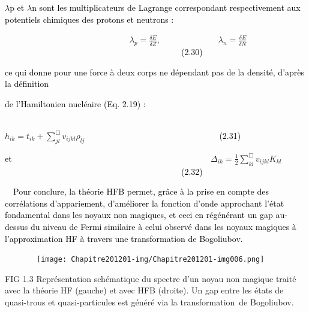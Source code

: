 \documentclass[a4paper]{article}
\begin{document}
\bigskip

\textcolor{black}{$\lambda $p et $\lambda $n sont les multiplicateurs de Lagrange correspondant respectivement aux
potentiels chimiques des protons et neutrons :}

\textcolor{black}{\ \ \ \ \ \ \ \ \ \ \ \ \ \ \ \ \ \ \ \ \ \ \ \ \ \ \ \ \ } $\lambda _p=\frac{\mathit{\delta
E}}{\mathit{\delta Z}},$\textcolor{black}{\ \ \ \ \ \ \ \ \ \ \ \ \ } $\lambda _n=\frac{\mathit{\delta
E}}{\mathit{\delta
N}}$\textcolor{black}{\ \ \ \ \ \ \ \ \ \ \ \ \ \ \ \ \ \ \ \ \ \ \ \ \ \ \ \ \ \ \ \ \ \ \ \ \ \ \ \ \ \ (2.30)}

\textcolor{black}{ce qui donne pour une force à deux corps ne dépendant pas de la densité, d’après la définition}

\textcolor{black}{de l’Hamiltonien nucléaire (Eq. 2.19) :}

\textcolor{black}{\ \ \ \ \ \ \ \ \ \ \ \ \ \ \ \ \ \ \ \ \ \ \ \ \ \ \ \ \ \ \ \ \ \ \ \ \ \ \ \ \ \ \ \ \ \ \ \ \ \ \ \ \ \ \ \ \ \ \ }
$h_{\mathit{ik}}=t_{\mathit{ik}}+\sum _{\mathit{jl}}^{\Box }v_{\mathit{ijkl}}\rho
_{\mathit{lj}}$\textcolor{black}{\ \ \ \ \ \ \ \ \ \ \ \ \ \ \ \ \ \ \ \ \ \ \ \ \ \ \ \ \ \ \ \ (2.31)}

\textcolor{black}{et}\textcolor{black}{
\ \ \ \ \ \ \ \ \ \ \ \ \ \ \ \ \ \ \ \ \ \ \ \ \ \ \ \ \ \ \ \ \ \ \ \ \ \ \ \ \ \ \ \ \ \ }
${\Delta}_{\mathit{ik}}=\frac 1 2\sum _{\mathit{kl}}^{\Box
}v_{\mathit{ijkl}}K_{\mathit{kl}}$\textcolor{black}{\ \ \ \ \ \ \ \ \ \ \ \ \ \ \ \ \ \ \ \ \ \ \ \ \ \ \ \ \ \ \ \ \ \ \ \ \ \ \ \ \ \ (2.32)}


\bigskip

\textcolor{black}{\ \ Pour conclure, la théorie HFB permet, grâce à la prise en compte des corrélations d’appariement,
d’améliorer la fonction d’onde approchant l’état fondamental dans les noyaux non magiques, et ceci en régénérant un gap
au-dessus du niveau de Fermi similaire à celui observé dans les noyaux magiques à l’approximation HF à travers une
transformation de Bogoliubov.}


\bigskip


\bigskip


\bigskip


\bigskip


\bigskip

\textbf{\textcolor{black}{\ \ \ \ \ \ }}
\texttt{[image: Chapitre201201-img/Chapitre201201-img006.png]} 

FIG 1.3 Représentation schématique du spectre d’un noyau non magique traité avec la théorie HF (gauche) et avec HFB
(droite). Un gap entre les états de quasi-trous et quasi-particules est généré via la transformation~de Bogoliubov.
\end{document}
